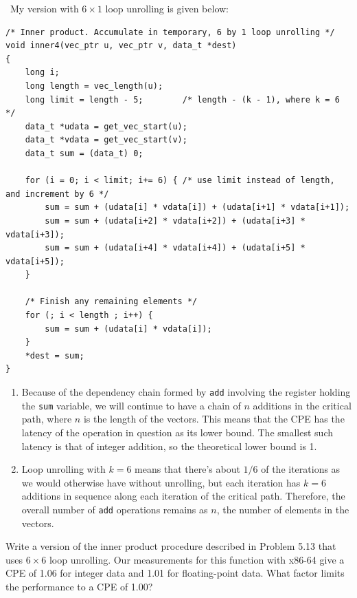 \documentclass[12pt]{article}
\newenvironment{ex}[2][Exercise]{\begin{trivlist}
		\item[\hskip \labelsep {\bfseries #1}\hskip \labelsep {\bfseries #2.}]}{\end{trivlist}}
\newenvironment{sol}[1][Solution]{\begin{trivlist}
		\item[\hskip \labelsep {\bfseries #1:}]}{\end{trivlist}}
\begin{document}
\begin{sol}
	\
	My version with $6\times 1$ loop unrolling is given below:
	\begin{lstlisting}
/* Inner product. Accumulate in temporary, 6 by 1 loop unrolling */
void inner4(vec_ptr u, vec_ptr v, data_t *dest)
{
	long i;
	long length = vec_length(u);
	long limit = length - 5; 		/* length - (k - 1), where k = 6 */
	data_t *udata = get_vec_start(u);
	data_t *vdata = get_vec_start(v);
	data_t sum = (data_t) 0;
	
	for (i = 0; i < limit; i+= 6) {	/* use limit instead of length, and increment by 6 */
		sum = sum + (udata[i] * vdata[i]) + (udata[i+1] * vdata[i+1]);
		sum = sum + (udata[i+2] * vdata[i+2]) + (udata[i+3] * vdata[i+3]);
		sum = sum + (udata[i+4] * vdata[i+4]) + (udata[i+5] * vdata[i+5]);
	}
	
	/* Finish any remaining elements */
	for (; i < length ; i++) {
		sum = sum + (udata[i] * vdata[i]);
	}
	*dest = sum;
}
	\end{lstlisting}
	\begin{enumerate}[label=(\alph*)]
		\item Because of the dependency chain formed by \texttt{add} involving the
		register holding the \texttt{sum} variable, we will continue to have a chain
		of $n$ additions in the critical path, where $n$ is the length of the vectors.
		This means that the CPE has the latency of the operation in question as its lower bound.
		The smallest such latency is that of integer addition, so the theoretical lower bound
		is 1.
		\item Loop unrolling with $k=6$ means that there's about $1/6$ of the iterations
		as we would otherwise have without unrolling, but each iteration has
		$k=6$ additions in sequence along each iteration of the critical path. Therefore, the
		overall number of \texttt{add} operations remains as $n$, the number of elements
		in the vectors.
	\end{enumerate}
\end{sol}

\begin{ex}{5.15}
	Write a version of the inner product procedure described in Problem 5.13 that uses
	$6\times 6$ loop unrolling. Our measurements for this function with x86-64 give a
	CPE of 1.06 for integer data and 1.01 for floating-point data. What factor limits the
	performance to a CPE of 1.00?
\end{ex}
\end{document}
